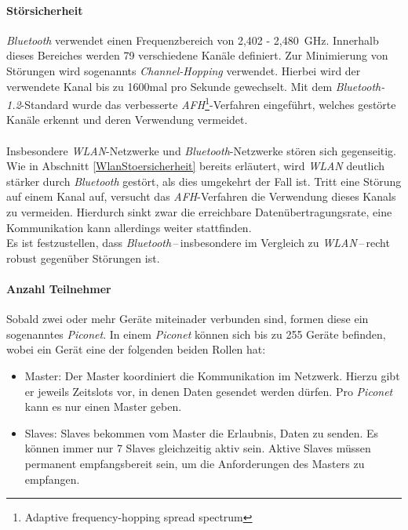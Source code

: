             \paragraph{Störsicherheit}
                \emph{Bluetooth} verwendet einen Frequenzbereich von 2,402 - 2,480~GHz. Innerhalb
                dieses Bereiches werden 79 verschiedene Kanäle definiert. Zur Minimierung
                von Störungen wird sogenannts \textsl{Channel-Hopping} verwendet. Hierbei
                wird der verwendete Kanal bis zu 1600mal pro Sekunde gewechselt. Mit dem
                \emph{Bluetooth-1.2}-Standard wurde das verbesserte  
                \emph{AFH}\footnote{Adaptive frequency-hopping spread spectrum}-Verfahren 
                eingeführt, welches gestörte Kanäle erkennt und deren Verwendung
                vermeidet.\\
                \\
                Insbesondere \emph{WLAN}-Netzwerke und \emph{Bluetooth}-Netzwerke stören sich 
                gegenseitig. Wie in Abschnitt \ref{WlanStoersicherheit} bereits
                erläutert, wird \emph{WLAN} deutlich stärker durch \emph{Bluetooth} gestört,
                als dies umgekehrt der Fall ist. Tritt eine Störung auf einem
                Kanal auf, versucht das \emph{AFH}-Verfahren die Verwendung dieses
                Kanals zu vermeiden. Hierdurch sinkt zwar die erreichbare
                Datenübertragungsrate, eine Kommunikation kann allerdings weiter 
                stattfinden.
                 \\
                 Es ist festzustellen, dass \emph{Bluetooth}\,--\,insbesondere im Vergleich
                 zu \emph{WLAN}\,--\,recht robust gegenüber Störungen ist.

            \paragraph{Anzahl Teilnehmer}
                Sobald zwei oder mehr Geräte miteinader verbunden sind, formen diese ein
                sogenanntes \emph{Piconet}. In einem \emph{Piconet} können sich bis
                zu 255 Geräte befinden, wobei ein Gerät eine der folgenden beiden Rollen
                hat:

                \begin{itemize}
                    \item{Master:} Der Master koordiniert die Kommunikation im Netzwerk.
                                   Hierzu gibt er jeweils Zeitslots vor, in denen
                                   Daten gesendet werden dürfen. Pro \emph{Piconet} kann
                                   es nur einen Master geben.
                    \item{Slaves:} Slaves bekommen vom Master die Erlaubnis, Daten zu senden.
                                   Es können immer nur 7 Slaves gleichzeitig aktiv sein.
                                   Aktive Slaves müssen permanent empfangsbereit sein,
                                   um die Anforderungen des Masters zu empfangen. 
                \end{itemize}

